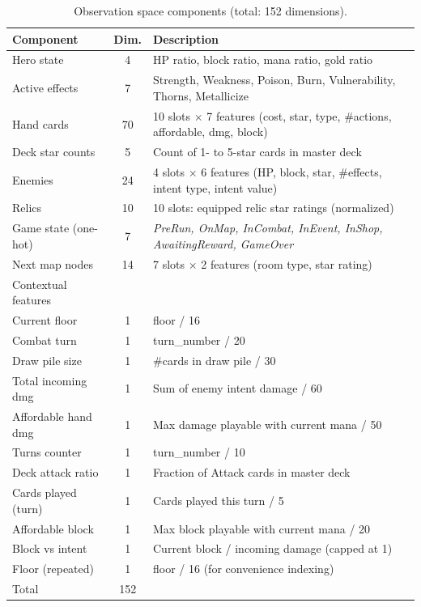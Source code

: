 \begin{table}[htbp]
    \centering
    \caption{Observation space components (total: 152 dimensions).}
    \label{tab:obs_space_impl}
    \begin{tabularx}{\linewidth}{lcX}
        \toprule
        Component & Dim. & Description \\
        \midrule
        Hero state         & 4  & HP ratio, block ratio, mana ratio, gold ratio \\
        Active effects     & 7  & Strength, Weakness, Poison, Burn, Vulnerability, Thorns, Metallicize \\
        Hand cards         & 70 & 10 slots $\times$ 7 features (cost, star, type, \#actions, affordable, dmg, block) \\
        Deck star counts   & 5  & Count of 1- to 5-star cards in master deck \\
        Enemies            & 24 & 4 slots $\times$ 6 features (HP, block, star, \#effects, intent type, intent value) \\
        Relics             & 10 & 10 slots: equipped relic star ratings (normalized) \\
        Game state (one-hot) & 7 & \textit{PreRun, OnMap, InCombat, InEvent, InShop, AwaitingReward, GameOver} \\
        Next map nodes     & 14 & 7 slots $\times$ 2 features (room type, star rating) \\
        \midrule
        Contextual features & & \\
        Current floor       & 1 & floor / 16 \\
        Combat turn         & 1 & turn\_number / 20 \\
        Draw pile size      & 1 & \#cards in draw pile / 30 \\
        Total incoming dmg  & 1 & Sum of enemy intent damage / 60 \\
        Affordable hand dmg & 1 & Max damage playable with current mana / 50 \\
        Turns counter       & 1 & turn\_number / 10 \\
        Deck attack ratio   & 1 & Fraction of Attack cards in master deck \\
        Cards played (turn) & 1 & Cards played this turn / 5 \\
        Affordable block    & 1 & Max block playable with current mana / 20 \\
        Block vs intent     & 1 & Current block / incoming damage (capped at 1) \\
        Floor (repeated)    & 1 & floor / 16 (for convenience indexing) \\
        \midrule
        Total & 152 & \\
        \bottomrule
    \end{tabularx}
\end{table}

